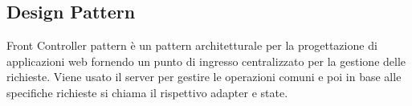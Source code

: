 \subsection{Design Pattern}
Front Controller pattern è un pattern architetturale per la progettazione di applicazioni web fornendo un punto di ingresso centralizzato per la gestione delle richieste.
Viene usato il server per gestire le operazioni comuni e poi in base alle specifiche richieste si chiama il rispettivo adapter e state.
\newpage
